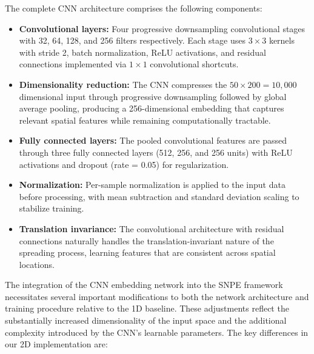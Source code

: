 The complete CNN architecture comprises the following components:

\begin{itemize}
	\item \textbf{Convolutional layers:} Four progressive downsampling convolutional stages with 32, 64, 128, and 256 filters respectively. Each stage uses $3 \times 3$ kernels with stride 2, batch normalization, ReLU activations, and residual connections implemented via $1 \times 1$ convolutional shortcuts.

	\item \textbf{Dimensionality reduction:} The CNN compresses the $50 \times 200 = 10,000$ dimensional input through progressive downsampling followed by global average pooling, producing a 256-dimensional embedding that captures relevant spatial features while remaining computationally tractable.

	\item \textbf{Fully connected layers:} The pooled convolutional features are passed through three fully connected layers (512, 256, and 256 units) with ReLU activations and dropout (rate = 0.05) for regularization.

	\item \textbf{Normalization:} Per-sample normalization is applied to the input data before processing, with mean subtraction and standard deviation scaling to stabilize training.

	\item \textbf{Translation invariance:} The convolutional architecture with residual connections naturally handles the translation-invariant nature of the spreading process, learning features that are consistent across spatial locations.
\end{itemize}


The integration of the CNN embedding network into the SNPE framework necessitates several important modifications to both the network architecture and training procedure relative to the 1D baseline. These adjustments reflect the substantially increased dimensionality of the input space and the additional complexity introduced by the CNN's learnable parameters. The key differences in our 2D implementation are:

